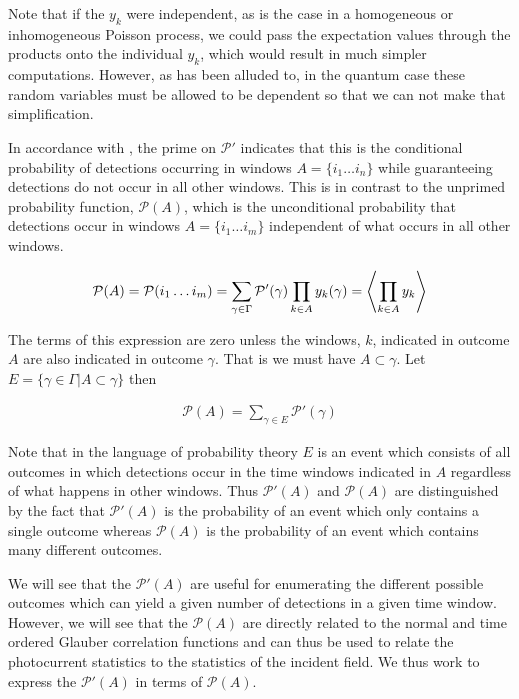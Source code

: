 \documentclass[12pt]{article}
\begin{document}
Note that if the $y_k$ were independent, as is the case in a homogeneous or inhomogeneous Poisson process, we could pass the expectation values through the products onto the individual $y_k$, which would result in much simpler computations. However, as has been alluded to, in the quantum case these random variables must be allowed to be dependent so that we can not make that simplification.

In accordance with \cite{Kelley1964}, the prime on $\mathcal{P}'$ indicates that this is the conditional probability of detections occurring in windows $A=\{i_1 \ldots i_n\}$ while guaranteeing detections do not occur in all other windows. This is in contrast to the unprimed probability function, $\mathcal{P}(A)$, which is the unconditional probability that detections occur in windows $A=\{i_1 \ldots i_m\}$ independent of what occurs in all other windows.

\begin{align}
\mathcal{P}(A) = \mathcal{P}(i_1 \ldots i_m) = \sum_{\gamma \in \Gamma} \mathcal{P}'(\gamma) \prod_{k \in A}y_k(\gamma)  = \Braket{\prod_{k \in A} y_k}
\end{align}

The terms of this expression are zero unless the windows, $k$, indicated in outcome $A$ are also indicated in outcome $\gamma$. That is we must have $A \subset \gamma$. Let $E = \{\gamma \in \Gamma| A \subset \gamma\}$ then

\begin{align}
\mathcal{P}(A) = \sum_{\gamma \in E} \mathcal{P}'(\gamma)
\end{align}

Note that in the language of probability theory $E$ is an event which consists of all outcomes in which detections occur in the time windows indicated in $A$ regardless of what happens in other windows. Thus $\mathcal{P}'(A)$ and $\mathcal{P}(A)$ are distinguished by the fact that $\mathcal{P}'(A)$ is the probability of an event which only contains a single outcome whereas $\mathcal{P}(A)$ is the probability of an event which contains many different outcomes.

We will see that the $\mathcal{P}'(A)$ are useful for enumerating the different possible outcomes which can yield a given number of detections in a given time window. However, we will see that the $\mathcal{P}(A)$ are directly related to the normal and time ordered Glauber correlation functions and can thus be used to relate the photocurrent statistics to the statistics of the incident field.
We thus work to express the $\mathcal{P}'(A)$ in terms of $\mathcal{P}(A)$.
\end{document}
